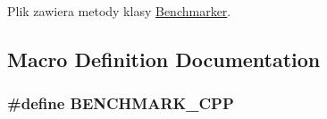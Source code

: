 Plik zawiera metody klasy \hyperlink{a00002}{Benchmarker}. 

\subsection{Macro Definition Documentation}
\hypertarget{a00008_af899221e0ac3b868dd9a8298bd9b1f12}{}
\subsubsection[{B\+E\+N\+C\+H\+M\+A\+R\+K\+\_\+\+C\+P\+P}]{\setlength{\rightskip}{0pt plus 5cm}\#define B\+E\+N\+C\+H\+M\+A\+R\+K\+\_\+\+C\+P\+P}\label{a00008_af899221e0ac3b868dd9a8298bd9b1f12}
